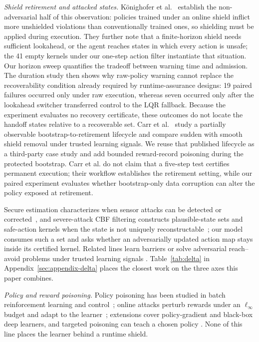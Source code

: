 \emph{Shield retirement and attacked states.}
Könighofer et al.~\cite{konighofer_online_shielding_2022} establish the
non-adversarial half of this observation: policies trained under an online
shield inflict more unshielded violations than conventionally trained ones, so
shielding must be applied during execution.  They further note that a
finite-horizon shield needs sufficient lookahead, or the agent reaches states
in which every action is unsafe; the 41 empty kernels under our one-step action
filter instantiate that situation.  Our horizon sweep quantifies the tradeoff
between warning time and admission.  The duration study then shows why
raw-policy warning cannot replace the recoverability condition already required
by runtime-assurance designs: 19 paired failures occurred only under raw
execution, whereas seven occurred only after the lookahead switcher transferred
control to the LQR fallback.  Because the experiment evaluates no recovery
certificate, these outcomes do not locate the handoff states relative to a
recoverable set.  Carr et al.~\cite{carr_partial_shielding_2023} study a partially observable
bootstrap-to-retirement lifecycle and compare sudden with smooth shield
removal under trusted learning signals.  We reuse that published lifecycle as
a third-party case study and add bounded reward-record poisoning during the
protected bootstrap.  Carr et al. do not claim that a five-step test certifies
permanent execution; their workflow establishes the retirement setting, while
our paired experiment evaluates whether bootstrap-only data corruption can
alter the policy exposed at retirement.

Secure estimation characterizes when sensor attacks can be detected or
corrected~\cite{pasqualetti_attack_2013,fawzi_secure_2014}, and severe-attack
CBF filtering constructs plausible-state sets and safe-action kernels when the
state is not uniquely reconstructable~\cite{tan_safety_2024}; our model
consumes such a set and asks whether an adversarially updated action map stays
inside its certified kernel.  Related lines learn barriers or solve
adversarial reach--avoid problems under trusted learning signals
\cite{brunke_barrier_learning_2022,
capone_bandit_safe_control_2025,wu_certifying_2022,pham_certified_2024,
hsu_isaacs_2023,nguyen_gameplay_2024}.  Table~\ref{tab:delta} in
Appendix~\ref{sec:appendix-delta} places the closest work on the three axes
this paper combines.

\emph{Policy and reward poisoning.}
Policy poisoning has been studied in batch reinforcement learning and
control~\cite{ma_policy_poisoning_2019}; online attacks perturb rewards under
an $\ell_\infty$ budget and adapt to the
learner~\cite{zhang_reward_poisoning_2020}; extensions cover policy-gradient
and black-box deep learners, and targeted poisoning can teach a chosen policy
\cite{sun_online_rl_poisoning_2021,xu_deep_reward_poisoning_2025,
rakhsha_policy_teaching_2020,everitt_corrupted_reward_2017}.  None of this
line places the learner behind a runtime shield.

